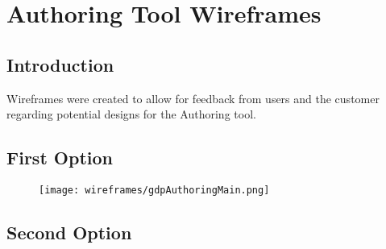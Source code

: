 \chapter{Authoring Tool Wireframes} \label{Chapter:Authoring Tool Wireframes}


\section{Introduction}

Wireframes were created to allow for feedback from users and the customer regarding potential designs for the Authoring tool.


\section{First Option} 

\begin{figure}
	\texttt{[image: wireframes/gdpAuthoringMain.png]}
	\caption{}
	\label{Figure:wireframes/authoringtool/main}
\end{figure}

\section{Second Option} 